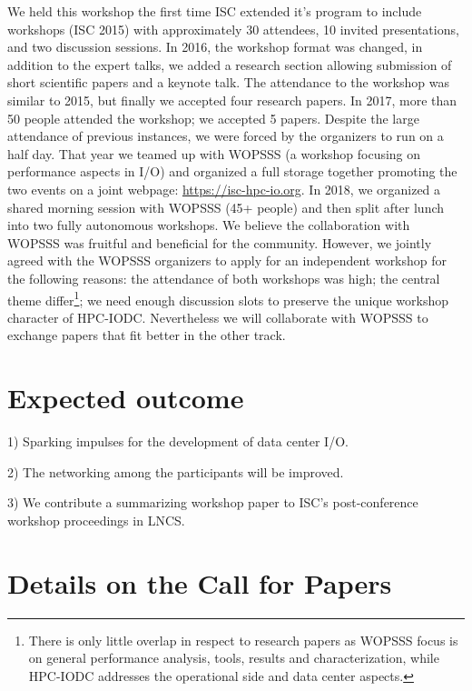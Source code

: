 \documentclass[a4paper,10pt]{article}
\begin{document}
We held this workshop the first time ISC extended it's program to include workshops (ISC 2015) with approximately 30 attendees, 10 invited presentations, and two discussion sessions.
In 2016, the workshop format was changed, in addition to the expert talks, we added a research section allowing submission of short scientific papers and a keynote talk.
The attendance to the workshop was similar to 2015, but finally we accepted four research papers.
In 2017, more than 50 people attended the workshop; we accepted 5 papers. %
Despite the large attendance of previous instances, we were forced by the organizers to run on a half day.
That year we teamed up with WOPSSS (a workshop focusing on performance aspects in I/O) and organized a full storage together promoting the two events on a joint webpage: \url{https://isc-hpc-io.org}.
In 2018, we organized a shared morning session with WOPSSS (45+ people) and then split after lunch into two fully autonomous workshops.
We believe the collaboration with WOPSSS was fruitful and beneficial for the community.
However, we jointly agreed with the WOPSSS organizers to apply for an independent workshop for the following reasons: the attendance of both workshops was high; the central theme differ\footnote{There is only little overlap in respect to research papers as WOPSSS focus is on general performance analysis, tools, results and characterization, while HPC-IODC addresses the operational side and data center aspects.}; we need enough discussion slots to preserve the unique workshop character of HPC-IODC.
Nevertheless we will collaborate with WOPSSS to exchange papers that fit better in the other track.


\section{Expected outcome}
1) Sparking impulses for the development of data center I/O.

2) The networking among the participants will be improved.

3) We contribute a summarizing workshop paper to ISC's post-conference workshop proceedings in LNCS.

\section{Details on the Call for Papers}
\end{document}
